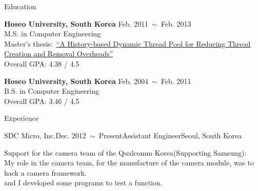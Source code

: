 \documentclass{resume} %
\begin{document}


\begin{rSection}{Education}

{\bf Hoseo University, South Korea} \hfill Feb. 2011~$\sim$~Feb. 2013 \\
M.S. in Computer Engineering \\
Master's thesis:~\href{http://dlibrary.hoseo.ac.kr/search/searchDetail.do?rec_key=SH1_000000950591}
{\footnotesize ``A History-based Dynamic Thread Pool for Reducing Thread Creation and Removal Overheads''} \\
Overall GPA: 4.38 / 4.5

{\bf Hoseo University, South Korea} \hfill Feb. 2004~$\sim$~Feb. 2011 \\
B.S. in Computer Engineering \\
Overall GPA: 3.46 / 4.5

\end{rSection}



\begin{rSection}{Experience}



  \begin{rSubsection}{SDC Micro, Inc.}{Dec. 2012~$\sim$~Present}{Assistant Engineer}{Seoul, South Korea}
  \item Support for the camera team of the Qualcomm Korea(Supporting Samsung): \\
    \small{
      My role in the camera team, for the manufacture of the camera module, was to hack a camera framework. \\
      and I developed some programs to test a function.
    }
  \end{rSubsection}

\end{rSection}
\vspace{-2mm}
\end{document}
